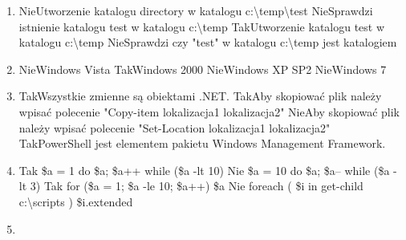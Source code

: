 \begin{enumerate}
		{Tak}{Polecenie ls jest aliasem polecenia Get-Children.}%
		{Nie}{PowerShell nie posiada modułów i przystawek pozwalających na rozszerzanie powłoki poprzez dodawanie nowych cmdletów.}%
		{Nie}{W systemie operacyjnym Windows XP SP2 domyślnie zainstalowaną wersją PowerShella jest wersja "PowerShell v2"}%
		{Tak}{PowerShell pozwala na przetwarzanie potokowe, które pozwala na przekazywanie obiektu z jednego cmdletu do drugiego, bez potrzeby korzystania z parsowania tekstu czy zmiany formatowania.}
		\newpage
		\item {}%
		{Nie}{Utworzenie katalogu directory w katalogu c:\textbackslash temp\textbackslash test}%
		{Nie}{Sprawdzi istnienie katalogu test w katalogu c:\textbackslash temp}%
		{Tak}{Utworzenie katalogu test w katalogu c:\textbackslash temp}%
		{Nie}{Sprawdzi czy "test" w katalogu c:\textbackslash temp jest katalogiem}
		\item {}%
		{Nie}{Windows Vista}%
		{Tak}{Windows 2000}%
		{Nie}{Windows XP SP2}%
		{Nie}{Windows 7}
		\item {}%
		{Tak}{Wszystkie zmienne są obiektami .NET.}%
		{Tak}{Aby skopiować plik należy wpisać polecenie "Copy-item lokalizacja1 lokalizacja2"}%
		{Nie}{Aby skopiować plik należy wpisać polecenie "Set-Location lokalizacja1 lokalizacja2"}%
		{Tak}{PowerShell jest elementem pakietu Windows Management Framework.}
		\item {}%
		{Tak}{ \$a = 1 do { \$a; \$a++ } while (\$a -lt 10) }%
		{Nie}{ \$a = 10 do { \$a; \$a-- } while (\$a -lt 3) }%
		{Tak}{ for (\$a = 1; \$a -le 10; \$a++) { \$a } }%
		{Nie}{ foreach ( \$i in get-child c:\textbackslash scripts ) {\$i.extended} }
		\item {}
\end{enumerate}
